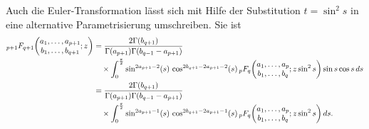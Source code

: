 Auch die Euler-Transformation lässt sich mit Hilfe der Substitution
$t=\sin^2 s$ in eine alternative Parametrisierung umschreiben.
Sie ist
\begin{align*}
\mathstrut_{p+1}F_{q+1}\biggl(
\begin{matrix}
a_1,\dots,a_{p+1}\\
b_1,\dots,b_{q+1}
\end{matrix}
;z
\biggr)
&=
\frac{2\Gamma(b_{q+1})}{\Gamma(a_{p+1})\Gamma(b_{q-1}-a_{p+1})}
\\
&\quad\times
\int_0^{\frac{\pi}2}
\sin^{2a_{p+1}-2}(s)\, \cos^{2b_{q+1}-2a_{p+1}-2}(s)
\,
\mathstrut_pF_q\biggl(
\begin{matrix}
a_1,\dots,a_p\\
b_1,\dots,b_q
\end{matrix};z\sin^2 s
\biggr)
\sin s\cos s
\,ds
\\
&=
\frac{2\Gamma(b_{q+1})}{\Gamma(a_{p+1})\Gamma(b_{q-1}-a_{p+1})}
\\
&\quad\times
\int_0^{\frac{\pi}2}
\sin^{2a_{p+1}-1}(s)\, \cos^{2b_{q+1}-2a_{p+1}-1}(s)
\,
\mathstrut_pF_q\biggl(
\begin{matrix}
a_1,\dots,a_p\\
b_1,\dots,b_q
\end{matrix};z\sin^2 s
\biggr)
\,ds.
\end{align*}
